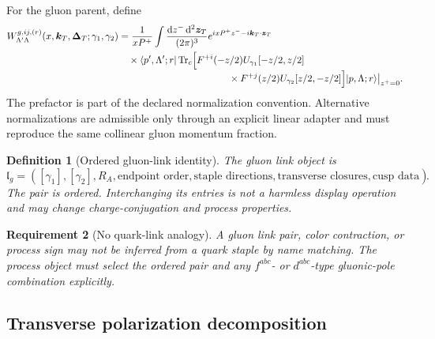 \documentclass[11pt]{article}
\newtheorem{definition}{Definition}[section]
\newtheorem{requirement}[definition]{Requirement}
\newcommand{\kT}{\bm{k}_{T}}
\newcommand{\DT}{\bm{\Delta}_{T}}
\newcommand{\dd}{\mathrm{d}}
\newcommand{\Tr}{\operatorname{Tr}}
\begin{document}
For the gluon parent, define \cite{MuldersRodrigues2001,LorcePasquini2013,Boer2016}
\begin{align}
 W_{\Lambda'\Lambda}^{g,ij,(r)}
 (x,\kT,\DT;\gamma_1,\gamma_2)
 &=\frac{1}{xP^+}
 \int\frac{\dd z^-\,\dd^2\bm z_T}{(2\pi)^3}
 e^{ixP^+z^- -i\kT\cdot\bm z_T}
\nonumber\\
 &\quad\times
 \langle p',\Lambda';r|
 \Tr_c\!\Big[
 F^{+i}(-z/2)U_{\gamma_1}[-z/2,z/2]
\nonumber\\[-1mm]
 &\hspace{4.0cm}\times
 F^{+j}(z/2)U_{\gamma_2}[z/2,-z/2]
 \Big]
 |p,\Lambda;r\rangle
 \big|_{z^+=0}.
\label{eq:gluon-gtmd-definition}
\end{align}
The prefactor is part of the declared normalization convention.  Alternative
normalizations are admissible only through an explicit linear adapter and
must reproduce the same collinear gluon momentum fraction.

\begin{definition}[Ordered gluon-link identity]
\label{def:ordered-gluon-link}
The gluon link object is
\begin{equation}
 \mathfrak l_g=([\gamma_1],[\gamma_2],R_A,
 \text{endpoint order},\text{staple directions},
 \text{transverse closures},\text{cusp data}).
\label{eq:ordered-gluon-link}
\end{equation}
The pair is ordered.  Interchanging its entries is not a harmless display
operation and may change charge-conjugation and process properties.
\end{definition}

\begin{requirement}[No quark-link analogy]
\label{req:no-quark-link-analogy}
A gluon link pair, color contraction, or process sign may not be inferred from
a quark staple by name matching.  The process object must select the ordered
pair and any \(f^{abc}\)- or \(d^{abc}\)-type gluonic-pole combination
explicitly.
\end{requirement}

\subsection{Transverse polarization decomposition}
\end{document}
